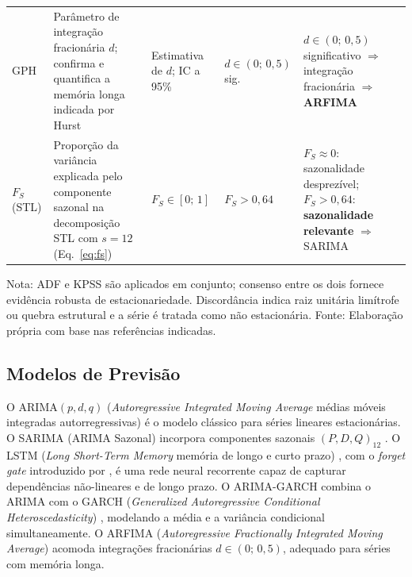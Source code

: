 \documentclass[12pt, a4paper]{article}
\begin{document}
\begin{table}[ht]
\begin{tabular}{p{1.5cm}p{3.9cm}p{2.3cm}p{1.7cm}p{3.5cm}p{2.1cm}}
    GPH &
    Parâmetro de integração fracionária $d$; confirma e quantifica
    a memória longa indicada por Hurst &
    Estimativa de $d$; IC a 95\% &
    $d \in (0;\,0{,}5)$ sig. &
    $d \in (0;\,0{,}5)$ significativo $\Rightarrow$
    integração fracionária $\Rightarrow$ \textbf{ARFIMA} &
    \cite{geweke1983estimation} \\[5pt]

    $F_S$ (STL) &
    Proporção da variância explicada pelo componente sazonal
    na decomposição STL com $s = 12$ (Eq.~\ref{eq:fs}) &
    $F_S \in [0;\,1]$ &
    $F_S > 0{,}64$ &
    $F_S \approx 0$: sazonalidade desprezível;
    $F_S > 0{,}64$: \textbf{sazonalidade relevante} $\Rightarrow$ SARIMA &
    \cite{hyndman2018forecasting} \\

    \bottomrule
  \end{tabular}

  \vspace{3pt}
  {\small Nota: ADF e KPSS são aplicados em conjunto; consenso entre os dois
  fornece evidência robusta de estacionariedade. Discordância indica raiz
  unitária limítrofe ou quebra estrutural e a série é tratada como não estacionária.
  Fonte: Elaboração própria com base nas referências indicadas.}
\end{table}

\subsection{Modelos de Previsão}

O ARIMA$(p,d,q)$ (\textit{Autoregressive Integrated Moving Average}
médias móveis integradas autorregressivas) \cite{box1970time} é o modelo
clássico para séries lineares estacionárias. O SARIMA (ARIMA Sazonal)
incorpora componentes sazonais $(P,D,Q)_{12}$ \cite{box1970time}. O LSTM
(\textit{Long Short-Term Memory} memória de longo e curto prazo)
\cite{hochreiter1997long}, com o \textit{forget gate} introduzido por
, é uma rede neural recorrente capaz de capturar
dependências não-lineares e de longo prazo. O ARIMA-GARCH combina o ARIMA
com o GARCH (\textit{Generalized Autoregressive Conditional
Heteroscedasticity}) \cite{bollerslev1986generalized}, modelando a média e a
variância condicional simultaneamente. O ARFIMA (\textit{Autoregressive
Fractionally Integrated Moving Average}) \cite{granger1980introduction}
acomoda integrações fracionárias $d \in (0;\, 0{,}5)$, adequado para séries
com memória longa.
\end{document}
